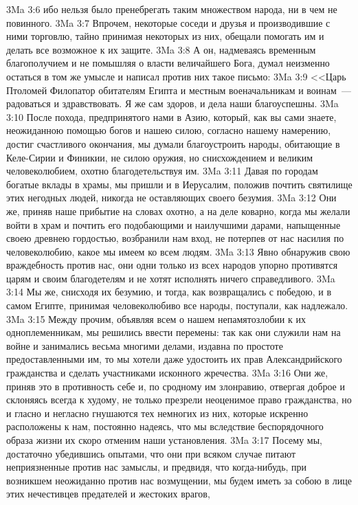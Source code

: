 \vs 3Ma 3:6 ибо нельзя было пренебрегать таким множеством народа, ни в чем не повинного.
\vs 3Ma 3:7 Впрочем, некоторые соседи и друзья и производившие с ними торговлю, тайно принимая некоторых из них, обещали помогать им и делать все возможное к их защите.
\vs 3Ma 3:8 А он, надмеваясь временным благополучием и не помышляя о власти величайшего Бога, думал неизменно остаться в том же умысле и написал против них такое письмо:
\vs 3Ma 3:9 <<Царь Птоломей Филопатор обитателям Египта и местным военачальникам и воинам~--- радоваться и здравствовать. Я же сам здоров, и дела наши благоуспешны.
\vs 3Ma 3:10 После похода, предпринятого нами в Азию, который, как вы сами знаете, неожиданною помощью богов и нашею силою, согласно нашему намерению, достиг счастливого окончания, мы думали благоустроить народы, обитающие в Келе-Сирии и Финикии, не силою оружия, но снисхождением и великим человеколюбием, охотно благодетельствуя им.
\vs 3Ma 3:11 Давая по городам богатые вклады в храмы, мы пришли и в Иерусалим, положив почтить святилище этих негодных людей, никогда не оставляющих своего безумия.
\vs 3Ma 3:12 Они же, приняв наше прибытие на словах охотно, а на деле коварно, когда мы желали войти в храм и почтить его подобающими и наилучшими дарами, напыщенные своею древнею гордостью, возбранили нам вход, не потерпев от нас насилия по человеколюбию, какое мы имеем ко всем людям.
\vs 3Ma 3:13 Явно обнаружив свою враждебность против нас, они одни только из всех народов упорно противятся царям и своим благодетелям и не хотят исполнять ничего справедливого.
\vs 3Ma 3:14 Мы же, снисходя их безумию, и тогда, как возвращались с победою, и в самом Египте, принимая человеколюбиво все народы, поступали, как надлежало.
\vs 3Ma 3:15 Между прочим, объявляя всем о нашем непамятозлобии к их одноплеменникам, мы решились ввести перемены: так как они служили нам на войне и занимались весьма многими делами, издавна по простоте предоставленными им, то мы хотели даже удостоить их прав Александрийского гражданства и сделать участниками исконного жречества.
\vs 3Ma 3:16 Они же, приняв это в противность себе и, по сродному им злонравию, отвергая доброе и склоняясь всегда к худому, не только презрели неоценимое право гражданства, но и гласно и негласно гнушаются тех немногих из них, которые искренно расположены к нам, постоянно надеясь, что мы вследствие беспорядочного образа жизни их скоро отменим наши установления.
\vs 3Ma 3:17 Посему мы, достаточно убедившись опытами, что они при всяком случае питают неприязненные против нас замыслы, и предвидя, что когда-нибудь, при возникшем неожиданно против нас возмущении, мы будем иметь за собою в лице этих нечестивцев предателей и жестоких врагов,
